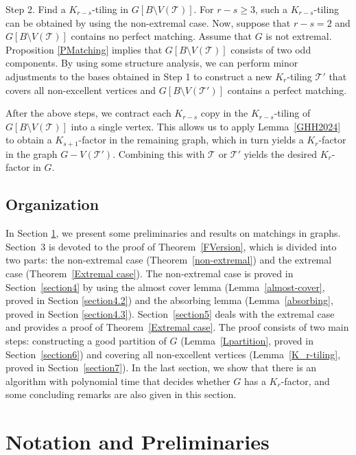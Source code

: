 \documentclass[11pt, a4paper]{article}
\theoremstyle{definition}
\newcommand{\<}{\subseteq}
\begin{document}
Step 2. Find a $K_{r-s}$-tiling in $G[B\setminus V(\mathcal{T})]$. For $r-s\geq 3$, such a $K_{r-s}$-tiling can be obtained by using the non-extremal case. Now, suppose that $r-s=2$ and $G[B\setminus V(\mathcal{T})]$ contains no perfect matching. Assume that $G$ is not extremal.  Proposition \ref{PMatching} implies that $G[B\setminus V(\mathcal{T})]$ consists of two odd components. 
By using some structure analysis, we can perform  minor adjustments to the bases obtained in Step 1 to construct a new $K_r$-tiling $\mathcal{T}'$ that covers all non-excellent vertices and $G[B\setminus V(\mathcal{T}')]$ contains a perfect matching.

After the above steps, we contract each $K_{r-s}$ copy in the $K_{r-s}$-tiling of  $G[B\setminus V(\mathcal{T})]$ into a single vertex. This allows us to apply Lemma~\ref{GHH2024} to obtain a $K_{s+1}$-factor in the remaining graph, which in turn yields a $K_r$-factor in the graph $G- V(\mathcal{T}')$. Combining this with $\mathcal{T}$ or $\mathcal{T}'$ yields the desired $K_r$-factor in $G$.


\subsection{Organization}
In Section \ref{section2}, we present some preliminaries and results on matchings in graphs. Section~3 is devoted to the proof of Theorem~\ref{FVersion}, which is divided into two parts: the non-extremal case (Theorem~\ref{non-extremal}) and the extremal case (Theorem~\ref{Extremal case}). The non-extremal case is proved in Section~\ref{section4} by using the almost cover lemma (Lemma~\ref{almost-cover}, proved in Section \ref{section4.2}) and the absorbing lemma (Lemma~\ref{absorbing}, proved in Section \ref{section4.3}). Section~\ref{section5} deals with the extremal case and provides a proof of Theorem~\ref{Extremal case}. The proof consists of two main steps: constructing a good partition of $G$ (Lemma~\ref{Lpartition}, proved in Section~\ref{section6}) and covering all non-excellent vertices (Lemma~\ref{K_r-tiling}, proved in Section~\ref{section7}). In the last section, we show that there
is an algorithm with polynomial time 
that decides whether $G$ has a $K_r$-factor, and some concluding remarks are also given in this  section. 




\section{Notation and Preliminaries}\label{section2}
\end{document}
